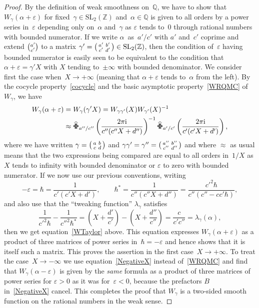 \documentclass[pdftex]{sigma}
\numberwithin{equation}{section}
\def\l{\lambda}
\def\SL{\mathrm{SL}}
\def\Phih{\widehat\Phi}
\def\a{\alpha}
\def\l{\lambda}
\def\Z{\mathbb Z}
\def\Q{\mathbb Q}
\def\m{ - }
\def\i{^{-1}}
\def\a{\alpha}
\def\l{\lambda}
\def\v{\varepsilon}
\def\sma#1#2#3#4{\bigl(\smallmatrix#1&#2\\#3&#4\endsmallmatrix\bigr)} %
\def\be{\begin{equation}}
\def\ee{\end{equation}}
\def\g{\gamma}
\def\bPhih{\mathbf{\Phih}}
\begin{document}
\begin{proof}
By the definition of weak smoothness on~$\Q$, we have to show that $W_\g(\a+\v)$
for fixed~${\g\in\SL_2(\Z)}$ and~$\a\in\Q$ is given to all orders by a power series in~$\v$
depending only on~$\a$ and~$\g$ as $\v$ tends to~0 through rational numbers with bounded
numerator. If we write $\a$~as~$a'/c'$ with $a'$ and~$c'$ coprime and extend
$\bigl(\!\smallmatrix a'\\c'\endsmallmatrix\!\bigr)$ to a matrix
$\g'=\sma{a'}{b'}{c'}{d'}\in\SL_2(\Z)$, then the condition of~$\v$ having bounded
numerator is easily seen to be equivalent to the condition that $\a+\v=\g'X$
with $X$ tending to~$\pm\infty$ with bounded denominator. We consider first the case
when~$X\to+\infty$ (meaning that $\a+\v$ tends to~$\a$ from the left). By the cocycle
property~\eqref{cocycle} and the basic asymptotic property~\eqref{WRQMC} of~$W_\g$, we
have
\begin{align*}%
W_\g(\a+\v) &= W_\g(\g'X) = W_{\g\g'}(X) W_{\g'}(X)\i \notag \\
 & \approx \bPhih_{a''/c''}\left(\frac{2\pi {\rm i}}{c''(c''X+d'')}\right)\i
  \bPhih_{a'/c'}\left(\frac{2\pi {\rm i}}{c'(c'X+d')}\right) ,
\end{align*}
where we have written $\g=\sma abcd$ and $\g\g'=\g''=\sma{a''}{b''}{c''}{d''}$ and where
$\approx$ as usual means that the two expressions being compared are equal to
all orders in~$1/X$ as $X$ tends to infinity with bounded denominator or $\v$ to zero
with bounded numerator. If we now use our previous conventions, writing
\[
-\v = \hbar = \frac1{c'(c'X+d')} , \qquad
\hbar^* = \frac1{c''(c''X+d'')} = \frac{{c'}^2\hbar}{c''(c''-cc'\hbar)} ,
\]
and also use that the ``tweaking function'' $\l_\g$ satisfies
\be
\label{tweakCoboundary}
\frac1{{c'}^2\hbar} \m \frac1{{c''}^2\hbar^*}
= \left(X+\frac{d'}{c'}\right)\m \left(X+\frac{d''}{c''}\right)
=\frac{c}{c'c''} = \l_\g(\a) ,
\ee
then we get equation~\eqref{WTaylor} above. This equation expresses $W_\g(\a+\v)$ as
a product of three matrices of power
series in~\hbox{$\hbar=-\v$} and hence shows that it is itself such a matrix. This
proves the assertion in the first case~\hbox{$X\to+\infty$}.
To treat the case~$X\to-\infty$ we use equation~\eqref{NegativeX} instead
of~\eqref{WRQMC} and find
that $W_\g(\a-\v)$ is given by the \emph{same} formula as a product of three matrices
of power series for $\v>0$ as it was for~$\v<0$, because the prefactors $B$
in~\eqref{NegativeX} cancel. This completes the proof that $W_\g$ is a two-sided
smooth function on the rational numbers in the weak sense.
\end{proof}
\end{document}
